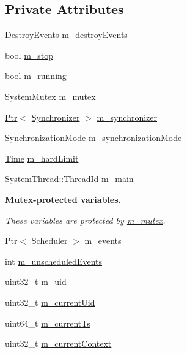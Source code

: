 \subsection*{Private Attributes}
\begin{DoxyCompactItemize}
\item 
\hyperlink{classns3_1_1RealtimeSimulatorImpl_aece9db06c7b61b8d95fe54ac2c7b9108}{Destroy\+Events} \hyperlink{classns3_1_1RealtimeSimulatorImpl_a18d17218962a0da6376ac2c05ba9a71a}{m\+\_\+destroy\+Events}
\item 
bool \hyperlink{classns3_1_1RealtimeSimulatorImpl_a8393aba34f9e1c9ab56475c2165547c9}{m\+\_\+stop}
\item 
bool \hyperlink{classns3_1_1RealtimeSimulatorImpl_a4907d7e58b7221984a86d5f63439ea8d}{m\+\_\+running}
\item 
\hyperlink{classns3_1_1SystemMutex}{System\+Mutex} \hyperlink{classns3_1_1RealtimeSimulatorImpl_a02be368e7cbd8a6f9d62db36c3fd373b}{m\+\_\+mutex}
\item 
\hyperlink{classns3_1_1Ptr}{Ptr}$<$ \hyperlink{classns3_1_1Synchronizer}{Synchronizer} $>$ \hyperlink{classns3_1_1RealtimeSimulatorImpl_a87a72268b521afcae7ea4c891c398d27}{m\+\_\+synchronizer}
\item 
\hyperlink{classns3_1_1RealtimeSimulatorImpl_a97b84e6926b9602a6d7c7326bf485807}{Synchronization\+Mode} \hyperlink{classns3_1_1RealtimeSimulatorImpl_a55d84defcf54c7751df163578ea90872}{m\+\_\+synchronization\+Mode}
\item 
\hyperlink{classns3_1_1Time}{Time} \hyperlink{classns3_1_1RealtimeSimulatorImpl_a9c3322bfb7203676b5a50f3ac5e4f31f}{m\+\_\+hard\+Limit}
\item 
System\+Thread\+::\+Thread\+Id \hyperlink{classns3_1_1RealtimeSimulatorImpl_aaa303327c2bd048980223e4f4fea1be6}{m\+\_\+main}
\end{DoxyCompactItemize}
\begin{Indent}{\bf Mutex-\/protected variables.}\par
{\em These variables are protected by \hyperlink{classns3_1_1RealtimeSimulatorImpl_a02be368e7cbd8a6f9d62db36c3fd373b}{m\+\_\+mutex}. }\begin{DoxyCompactItemize}
\item 
\hyperlink{classns3_1_1Ptr}{Ptr}$<$ \hyperlink{classns3_1_1Scheduler}{Scheduler} $>$ \hyperlink{classns3_1_1RealtimeSimulatorImpl_a0cccd690eafca8285f5cc4d3909a9593}{m\+\_\+events}
\item 
int \hyperlink{classns3_1_1RealtimeSimulatorImpl_a1ef7b74c3be3d3febb1f07f8db44fb76}{m\+\_\+unscheduled\+Events}
\item 
uint32\+\_\+t \hyperlink{classns3_1_1RealtimeSimulatorImpl_a733827168b695086e183a53f5a0dacf2}{m\+\_\+uid}
\item 
uint32\+\_\+t \hyperlink{classns3_1_1RealtimeSimulatorImpl_a74f7fe3f1ca8b69baac6261b11f1c2a6}{m\+\_\+current\+Uid}
\item 
uint64\+\_\+t \hyperlink{classns3_1_1RealtimeSimulatorImpl_a613ff41dee1e66129c4d5cc81c00cf60}{m\+\_\+current\+Ts}
\item 
uint32\+\_\+t \hyperlink{classns3_1_1RealtimeSimulatorImpl_a4b9c6ce7a99f0b0a6e115eb3d427976c}{m\+\_\+current\+Context}
\end{DoxyCompactItemize}
\end{Indent}
